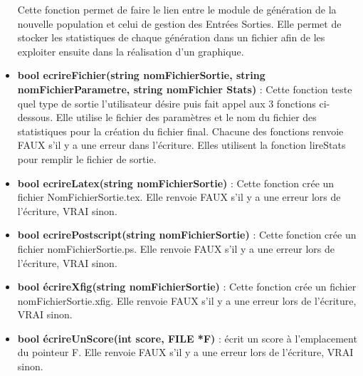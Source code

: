 \documentclass[a4paper,11pt]{article}
\begin{document}
\begin{itemize}
					Cette fonction permet de faire le lien entre le module de génération de la nouvelle population et celui de gestion des Entrées Sorties. 
					Elle permet de stocker les statistiques de chaque génération dans un fichier afin de les exploiter ensuite dans la réalisation d’un graphique.\vspace{0.2cm}
				\item \textbf{bool ecrireFichier(string nomFichierSortie, string nomFichierParametre, string nomFichier Stats)} : Cette fonction teste quel type de sortie l’utilisateur désire puis fait appel aux 3 fonctions ci-dessous. 
					Elle utilise le fichier des paramètres et le nom du fichier des statistiques pour la création du fichier final. 
					Chacune des fonctions renvoie FAUX s’il y a une erreur dans l’écriture. Elles utilisent la fonction lireStats pour remplir le fichier de sortie.\vspace{0.2cm}
				\item \textbf{bool ecrireLatex(string nomFichierSortie)} : Cette fonction crée un fichier NomFichierSortie.tex.
					Elle renvoie FAUX s’il y a une erreur lors de l’écriture, VRAI sinon.\vspace{0.2cm}
				\item \textbf{bool ecrirePostscript(string nomFichierSortie)}  : Cette fonction crée un fichier nomFichierSortie.ps.
					Elle renvoie FAUX s’il y a une erreur lors de l’écriture, VRAI sinon.\vspace{0.2cm}
				\item \textbf{bool écrireXfig(string nomFichierSortie)}  : Cette fonction crée un fichier nomFichierSortie.xfig.
					Elle renvoie FAUX s’il y a une erreur lors de l’écriture, VRAI sinon.\vspace{0.2cm}
				\item \textbf{bool écrireUnScore(int score, FILE *F)} : écrit un score à l’emplacement du pointeur F.
					Elle renvoie FAUX s’il y a une erreur lors de l’écriture, VRAI sinon. \\
			\end{itemize}
		
\end{document}
